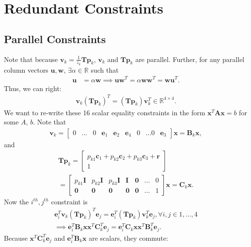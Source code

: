 \documentclass{article}
\newcommand{\mbf}[1]{\mathbf{#1}}
\newcommand{\bbm}{\begin{bmatrix}}
\newcommand{\ebm}{\end{bmatrix}}
\begin{document}
\newpage
\section{Redundant Constraints}

\subsection{Parallel Constraints}

Note that because $\mbf{v}_k = \frac{1}{z_k} \mbf{T} \mbf{p}_k$, $\mbf{v}_k$ and $\mbf{T} \mbf{p}_k$ are parallel.
Further, for any parallel column vectors $\mbf{u}, \mbf{w}$, $\exists \alpha \in \mathbb{R}$ such that
\begin{align}
    \mbf{u} &= \alpha \mbf{w}
    \implies \mbf{u}\mbf{w}^T = \alpha \mbf{w}\mbf{w}^T = \mbf{w} \mbf{u}^T.
\end{align}
Thus, we can right:
\begin{align}
    \mbf{v}_k (\mbf{T} \mbf{p}_k)^T = (\mbf{T} \mbf{p}_k)\mbf{v}_k^T \in \mathbb{R}^{4 \times 4}.
\end{align}
We want to re-write these 16 scalar equality constraints in the form $\mbf{x}^T \mbf{A} \mbf{x} = b$ for some $A$, $b$.
Note that
\begin{align}
    \mbf{v}_k = \bbm
        0 & \dots & 0 & \mbf{e}_1 & \mbf{e}_2 & \mbf{e}_4 & 0 & \dots 0 & \mbf{e}_3
    \ebm \mbf{x} = \mbf{B}_k \mbf{x},
\end{align}
and
\begin{align}
    \mbf{T} \mbf{p}_k = \bbm
        p_{k1} \mbf{c}_1 + p_{k2} \mbf{c}_2 + p_{k3} \mbf{c}_3 + \mbf{r} \\
        1
    \ebm \\
    = \bbm
        p_{k1} \mbf{I} & p_{k2} \mbf{I} & p_{k3} \mbf{I}  & \mbf{I} & \mbf{0} & \dots & 0 \\
        \mbf{0}        & \mbf{0}        & \mbf{0}         & \mbf{0} & \mbf{0} & \dots & 1
    \ebm \mbf{x} = \mbf{C}_k \mbf{x}.
\end{align}
Now the $i^{th}, j^{th}$ constraint is
\begin{align}
    \mbf{e}_i^T \mbf{v}_k (\mbf{T} \mbf{p}_k)^T \mbf{e}_j = \mbf{e}_i^T (\mbf{T} \mbf{p}_k)\mbf{v}_k^T \mbf{e}_j, \forall i,j \in {1, \dots, 4} \\
    \implies
    \mbf{e}_i^T  \mbf{B}_k \mbf{x} \mbf{x}^T \mbf{C}_k^T \mbf{e}_j = \mbf{e}_i^T  \mbf{C}_k \mbf{x} \mbf{x}^T \mbf{B}_k^T \mbf{e}_j.
\end{align}
Because $\mbf{x}^T \mbf{C}_k^T \mbf{e}_j$ and $\mbf{e}_i^T  \mbf{B}_k \mbf{x}$ are scalars, they commute:
\end{document}
